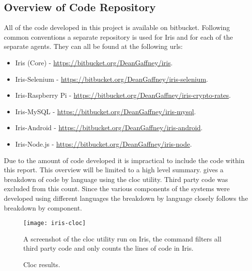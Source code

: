 \documentclass[12pt,a4paper,titlepage]{report}
\begin{document}
\printbibliography

\clearpage

\begin{appendices}


\chapter{Overview of Code Repository}
All of the code developed in this project is available on bitbucket. Following common conventions a separate repository is used for Iris and for each of the separate agents. They can all be found at the following urls:
\begin{itemize}
    \item Iris (Core) - \url{https://bitbucket.org/DeanGaffney/iris}.
    \item Iris-Selenium - \url{https://bitbucket.org/DeanGaffney/iris-selenium}.
    \item Iris-Raspberry Pi - \url{https://bitbucket.org/DeanGaffney/iris-crypto-rates}.
    \item Iris-MySQL - \url{https://bitbucket.org/DeanGaffney/iris-mysql}.
    \item Iris-Android - \url{https://bitbucket.org/DeanGaffney/iris-android}.
    \item Iris-Node.js - \url{https://bitbucket.org/DeanGaffney/iris-node}.
\end{itemize}

Due to the amount of code developed it is impractical to include the code within this report. This overview will be limited to a high level summary.  gives a breakdown of code by language using the cloc utility. Third party code was excluded from this count. Since the various components of the systems were developed using different languages the breakdown by language closely follows the breakdown by component.

\begin{figure}[H]
\begin{tcolorbox}
\begin{center}
\texttt{[image: iris-cloc]}
\end{center}
A screenshot of the cloc utility run on Iris, the command filters all third party code and only counts the lines of code in Iris.
\end{tcolorbox}
\caption{Cloc results.}
\label{fig:cloc}
\end{figure}


\end{appendices}
\end{document}
